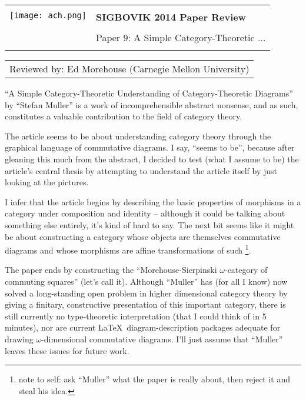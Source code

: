 \documentclass[12pt]{article}
\begin{document}
{\sffamily
\begin{tabular}{ll}
\multirow{2}{*}{\texttt{[image: ach.png]}}\\
& \textbf{\Huge{SIGBOVIK 2014 Paper Review}} \\ &\\
& \LARGE{Paper $9$: A Simple Category-Theoretic ...} \\
&\\
\hline
\end{tabular}}

{\large\bf
\begin{tabular}{l}
Reviewed by: Ed Morehouse (Carnegie Mellon University) \\
\end{tabular}}

	``A Simple Category-Theoretic Understanding of Category-Theoretic Diagrams'' by ``Stefan Muller''
	is a work of incomprehensible abstract nonsense,
	and as such, constitutes a valuable contribution to the field of category theory.
	
	The article seems to be about understanding category
	theory through the graphical language of commutative diagrams.
	I say, ``seems to be'', because after gleaning this much from the abstract,
	I decided to test (what I assume to be) the article's central thesis
	by attempting to understand the article itself by just looking at the pictures.
	
	I infer that the article begins by describing the basic properties
	of morphisms in a category under composition and identity
	 -- although it could be talking about something else entirely, it's kind of hard to say.
	The next bit seems like it might be about constructing a category
	whose objects are themselves commutative diagrams and whose morphisms are affine transformations of such%
	\footnote
	{
		note to self: ask ``Muller'' what the paper is really about, then reject it and steal his idea.
	}.
	
	The paper ends by constructing the ``Morehouse-Sierpinski $\omega$-category of commuting squares''
	(let's call it).
	Although ``Muller'' has (for all I know) now solved a long-standing open problem in higher dimensional category theory
	by giving a finitary, constructive presentation of this important category,
	there is still currently no type-theoretic interpretation (that I could think of in 5 minutes),
	nor are current \LaTeX \, diagram-description packages
	adequate for drawing $\omega$-dimensional commutative diagrams.
	I'll just assume that ``Muller'' leaves these issues for future work.
		
\end{document}
